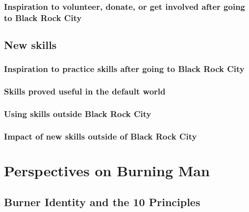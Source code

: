 \documentclass[
]{book}
\begin{document}
\hypertarget{inspiration-to-volunteer-donate-or-get-involved-after-going-to-black-rock-city}{%
\subsection{Inspiration to volunteer, donate, or get involved after going to Black Rock City}\label{inspiration-to-volunteer-donate-or-get-involved-after-going-to-black-rock-city}}

\hypertarget{new-skills}{%
\section{New skills}\label{new-skills}}

\hypertarget{inspiration-to-practice-skills-after-going-to-black-rock-city}{%
\subsection{Inspiration to practice skills after going to Black Rock City}\label{inspiration-to-practice-skills-after-going-to-black-rock-city}}

\hypertarget{skills-proved-useful-in-the-default-world}{%
\subsection{Skills proved useful in the default world}\label{skills-proved-useful-in-the-default-world}}

\hypertarget{using-skills-outside-black-rock-city}{%
\subsection{Using skills outside Black Rock City}\label{using-skills-outside-black-rock-city}}

\hypertarget{impact-of-new-skills-outside-of-black-rock-city}{%
\subsection{Impact of new skills outside of Black Rock City}\label{impact-of-new-skills-outside-of-black-rock-city}}

\hypertarget{perspectives-on-burning-man}{%
\chapter{Perspectives on Burning Man}\label{perspectives-on-burning-man}}

\hypertarget{burner-identity-and-the-10-principles}{%
\section{Burner Identity and the 10 Principles}\label{burner-identity-and-the-10-principles}}
\end{document}
